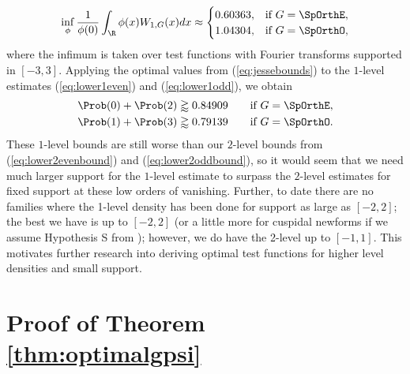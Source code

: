 \documentclass[12pt, reqno]{amsart}
\numberwithin{equation}{section}
\theoremstyle{definition}
\theoremstyle{remark}
\begin{document}
\begin{equation}
	\inf_\phi \frac{1}{\phi(0)} \int_\R \phi(x) W_{1, G} (x) dx
		\approx
		\begin{cases}
			0.60363, 		&\text{if } G = \SpOrthE, \\
			1.04304, 		&\text{if } G = \SpOrthO,
		\end{cases}	\label{eq:jessebounds}
\end{equation}
where the infimum is taken over test functions with Fourier transforms supported in $[-3, 3]$. Applying the optimal values from (\ref{eq:jessebounds}) to the $1$-level estimates (\ref{eq:lower1even}) and (\ref{eq:lower1odd}), we obtain
\begin{align}
	\Prob(0) + \Prob(2) &\gtrapprox 0.84909 \qquad \text{if } G = \SpOrthE,\\
	\Prob(1) + \Prob(3) &\gtrapprox 0.79139 \qquad \text{if } G = \SpOrthO.
\end{align}
These $1$-level bounds are still worse than our $2$-level bounds from (\ref{eq:lower2evenbound}) and (\ref{eq:lower2oddbound}), so it would seem that we need much larger support for the $1$-level estimate to surpass the $2$-level estimates for fixed support at these low orders of vanishing. Further, to date there are no families where the 1-level density has been done for support as large as $[-2, 2]$; the best we have is up to $[-2,
2]$ (or a little more for cuspidal newforms if we assume Hypothesis S from
\cite{ILS}); however, we do have the 2-level up to $[-1,1]$.
This motivates further research into deriving optimal test functions for higher level densities and small support. 

\section{Proof of Theorem \ref{thm:optimalgpsi}}

\end{document}

